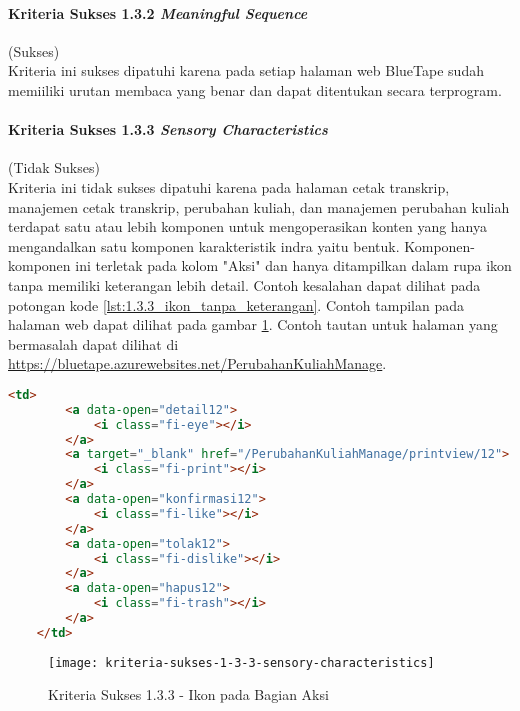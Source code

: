\paragraph{Kriteria Sukses 1.3.2 \textit{Meaningful Sequence}}
\label{par:kepatuhan_bluetape_kriteria_sukses_1.3.2}
(Sukses)\\

Kriteria ini sukses dipatuhi karena pada setiap halaman web BlueTape sudah memiiliki urutan membaca yang benar dan dapat ditentukan secara terprogram. 

\paragraph{Kriteria Sukses 1.3.3 \textit{Sensory Characteristics}}
\label{par:kepatuhan_bluetape_kriteria_sukses_1.3.3}
(Tidak Sukses)\\

Kriteria ini tidak sukses dipatuhi karena pada halaman cetak transkrip, manajemen cetak transkrip, perubahan kuliah, dan manajemen perubahan kuliah terdapat satu atau lebih komponen untuk mengoperasikan konten yang hanya mengandalkan satu komponen karakteristik indra yaitu bentuk. Komponen-komponen ini terletak pada kolom "Aksi" dan hanya ditampilkan dalam rupa ikon tanpa memiliki keterangan lebih detail. Contoh kesalahan dapat dilihat pada potongan kode \ref{lst:1.3.3_ikon_tanpa_keterangan}. Contoh tampilan pada halaman web dapat dilihat pada gambar \ref{fig:1.3.3_sensory_characteristics}. Contoh tautan untuk halaman yang bermasalah dapat dilihat di \url{https://bluetape.azurewebsites.net/PerubahanKuliahManage}.

\begin{lstlisting}[frame=single, label={lst:1.3.3_ikon_tanpa_keterangan}, language=HTML, caption=Kriteria Sukses 1.3.3 - Ikon Tanpa Keterangan]
    <td>
        <a data-open="detail12">
            <i class="fi-eye"></i>
        </a>
        <a target="_blank" href="/PerubahanKuliahManage/printview/12">
            <i class="fi-print"></i>
        </a>
        <a data-open="konfirmasi12">
            <i class="fi-like"></i>
        </a>  
        <a data-open="tolak12">
            <i class="fi-dislike"></i>
        </a>
        <a data-open="hapus12">
            <i class="fi-trash"></i>
        </a>
    </td>
\end{lstlisting}

\begin{figure}[H]
    \centering  
    \texttt{[image: kriteria-sukses-1-3-3-sensory-characteristics]}  
    \caption[Kriteria Sukses 1.3.3 - Ikon pada Bagian Aksi]{Kriteria Sukses 1.3.3 - Ikon pada Bagian Aksi}
    \label{fig:1.3.3_sensory_characteristics}  
\end{figure} 

